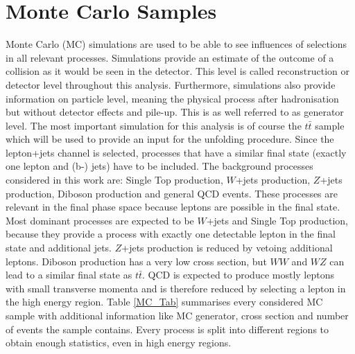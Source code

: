 	\section{Monte Carlo Samples}
	Monte Carlo (MC) simulations are used to be able to see influences of selections in all relevant processes. Simulations provide an estimate of the outcome of a collision as it would be seen in the detector. This level is called reconstruction or detector level throughout this analysis. Furthermore, simulations also provide information on particle level, meaning the physical process after hadronisation but without detector effects and pile-up. This is as well referred to as generator level. The most important simulation for this analysis is of course the $t\bar{t}$ sample which will be used to provide an input for the unfolding procedure. Since the lepton+jets channel is selected, processes that have a similar final state (exactly one lepton and (b-) jets) have to be included. The background processes considered in this work are: Single Top production, $W$+jets production, $Z$+jets production, Diboson production and general QCD events. These processes are relevant in the final phase space because leptons are possible in the final state. Most dominant processes are expected to be $W$+jets and Single Top production, because they provide a process with exactly one detectable lepton in the final state and additional jets. $Z$+jets production is reduced by vetoing additional leptons. Diboson production has a very low cross section, but $WW$ and $WZ$ can lead to a similar final state as $t\bar{t}$. QCD is expected to produce mostly leptons with small transverse momenta and is therefore reduced by selecting a lepton in the high energy region. Table \ref{MC_Tab} summarises every considered MC sample with additional information like MC generator, cross section and number of events the sample contains. Every process is split into different regions to obtain enough statistics, even in high energy regions.	
